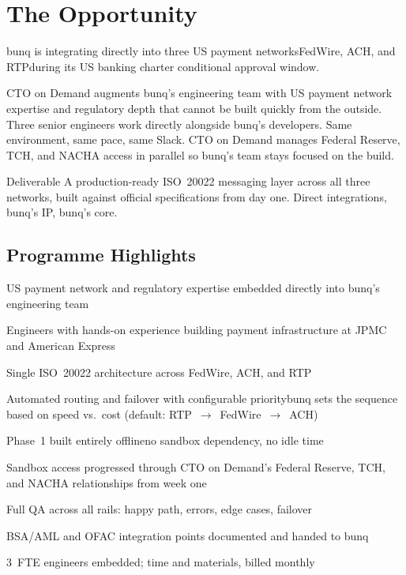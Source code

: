
\section{The Opportunity}

bunq is integrating directly into three US payment networks\dash FedWire, ACH, and RTP\dash during its US banking charter conditional approval window.

CTO on Demand augments bunq's engineering team with US payment network expertise and regulatory depth that cannot be built quickly from the outside. Three senior engineers work directly alongside bunq's developers. Same environment, same pace, same Slack. CTO on Demand manages Federal Reserve, TCH, and NACHA access in parallel so bunq's team stays focused on the build.

\begin{keyinsight}{Deliverable}
A production-ready ISO~20022 messaging layer across all three networks, built against official specifications from day one. Direct integrations, bunq's IP, bunq's core.
\end{keyinsight}

\subsection{Programme Highlights}

\begin{highlights}
\item US payment network and regulatory expertise embedded directly into bunq's engineering team
\item Engineers with hands-on experience building payment infrastructure at JPMC and American Express
\item Single ISO~20022 architecture across FedWire, ACH, and RTP
\item Automated routing and failover with configurable priority\dash bunq sets the sequence based on speed vs.\ cost (default: RTP~$\to$~FedWire~$\to$~ACH)
\item Phase~1 built entirely offline\dash no sandbox dependency, no idle time
\item Sandbox access progressed through CTO on Demand's Federal Reserve, TCH, and NACHA relationships from week one
\item Full QA across all rails: happy path, errors, edge cases, failover
\item BSA/AML and OFAC integration points documented and handed to bunq
\item 3~FTE engineers embedded; time and materials, billed monthly
\end{highlights}
